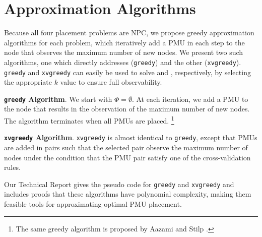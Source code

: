 \section{Approximation Algorithms}
\label{sec:approx}

Because all four placement problems are NPC, we propose greedy approximation algorithms for each problem, which iteratively add 
a PMU in each step to the node that observes the maximum number of new nodes. We present two such algorithms, one which directly addresses \maxinc ({\tt greedy}) and the other 
\xvalpart ({\tt xvgreedy}).  \\
{\tt greedy} and {\tt xvgreedy} can easily be used to solve \full and \xvals, respectively, by selecting the appropriate $k$ value to ensure full observability.

{\bf {\tt greedy} Algorithm}. We start with $\Phi = \emptyset$.  At each iteration, we add a PMU to the node that results in the observation of the maximum number of 
new nodes. The algorithm terminates when all PMUs are placed.  {\footnote {\small The same greedy algorithm is proposed by Aazami and Stilp \cite{Aazami07}. }}


{\bf {\tt xvgreedy} Algorithm}. {\tt xvgreedy} is almost identical to {\tt greedy}, except that PMUs are added in pairs such that the selected pair observe
the maximum number of nodes under the condition that the PMU pair satisfy one of the cross-validation rules. %

Our Technical Report \cite{Tech12} gives the pseudo code for {\tt greedy} and {\tt xvgreedy} and includes proofs
that these algorithms have polynomial complexity, making them feasible tools for approximating optimal PMU placement. 

